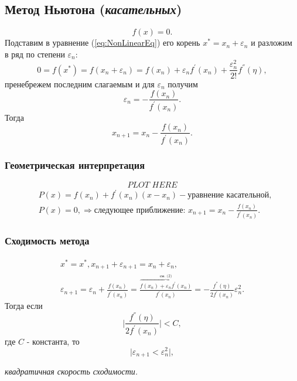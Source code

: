 \documentclass[a4paper,11pt]{article}
\begin{document}
\subsection{Метод Ньютона (\textit{касательных})}
\begin{equation}
  f(x) = 0.
  \label{eq:NonlinearEq}
\end{equation}
Подставим в уравнение (\ref{eq:NonLinearEq}) его корень $x^*=x_n+\varepsilon_n$ и разложим \\ в ряд по степени $\varepsilon_n$:
\begin{equation}
  0 = f(x^*) = f(x_n+\varepsilon_n) = f(x_n)+\varepsilon_nf^{'}(x_n)+\frac{\varepsilon_n^2}{2!}f^{''}(\eta),
\end{equation}
пренебрежем последним слагаемым и для $\varepsilon_n$ получим
\begin{equation*}
  \varepsilon_n = - \frac{f(x_n)}{f^{'}(x_n)}.
\end{equation*}
Тогда
\begin{equation}
  x_{n+1} = x_n - \frac{f(x_n)}{f^{'}(x_n)}.
\end{equation}

\subsubsection{Геометрическая интерпретация}
\begin{equation*}
  \textit{PLOT HERE}
\end{equation*}
\begin{align*}
  &P(x) = f(x_n) + f^{'}(x_n)(x-x_n) - \text{уравнение касательной}, \\
  &P(x) = 0, \Rightarrow \text{следующее приближение: } x_{n+1} = x_n - \frac{f(x_n)}{f^{'}(x_n)}.
\end{align*}

\subsubsection{Сходимость метода}
\begin{gather*}
  x^* = x^*, x_{n+1}+\varepsilon_{n+1} = x_n+\varepsilon_n, \\
  \varepsilon_{n+1} = \varepsilon_n + \frac{f(x_n)}{f^{'}(x_n)} = \frac{\overbrace{f(x_n) + \varepsilon_nf^{'}(x_n)}^{\text{см. ($2$)}}}{f^{'}(x_n)} =
  -\frac{f^{''}(\eta)}{2f^{'}(x_n)}\varepsilon_n^2.
\end{gather*}
Тогда если \[\bigg| \frac{f^{''}(\eta)}{2f^{'}(x_n)} \bigg| < C,\] где $C$ - константа, то
\begin{equation}
  \bigg| \varepsilon_{n+1} < \varepsilon_n^2 \bigg|,
\end{equation}
\begin{center}
  \small \textit{квадратичная скорость сходимости.}
\end{center}
\end{document}

